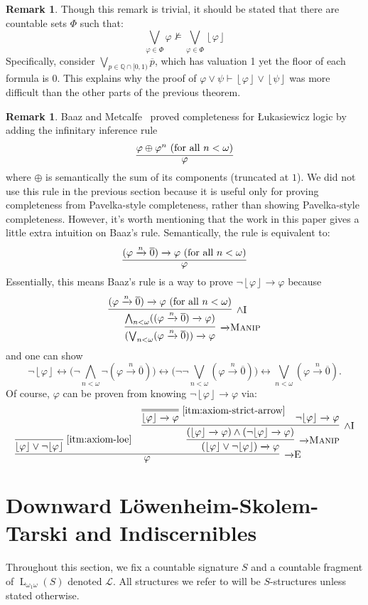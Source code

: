 \documentclass{amsart}
\theoremstyle{definition}
\newtheorem{remark}[theorem]{Remark}
\numberwithin{equation}{theorem}
\renewcommand{\phi}{\varphi}
\newcommand{\Q}{\mathbb{Q}}
\newcommand{\unwedge}{{\wedge}}
\newcommand{\proves}{\vdash}
\newcommand{\strict}[1]{{\left\lfloor#1\right\rfloor}}
\newcommand{\rat}[1]{{\overline{#1}}}
\newcommand{\narrow}[1]{\xrightarrow{#1}}
\renewcommand{\to}{\narrow{}}
\newcommand{\arr}{{\to}}
\newcommand{\intro}{\!\operatorname{I}}
\newcommand{\elim}{\!\operatorname{E}}
\newcommand{\aref}[1]{\!\text{\ref{itm:axiom-#1}}}
\newcommand{\pushdown}{\arr\text{\sc{Manip}}}
\newcommand{\baselang}{\operatorname{L}}
\newcommand{\lang}{\baselang_{\omega_1\omega}}
\newcommand{\frag}{\mathcal{L}}
\newcommand{\luk}{{\L}ukasiewicz}
\begin{document}
\begin{remark}
  Though this remark is trivial, it should be stated that there are countable sets $\Phi$ such that:
  \[
    \bigvee_{\phi\in\Phi}\phi\not\models\bigvee_{\phi\in\Phi}\strict\phi
  \]
  Specifically, consider $\bigvee_{p\in\Q\cap[0,1)}\rat p$, which has valuation 1 yet the floor of each formula is 0.
  This explains why the proof of $\phi\vee\psi\proves\strict\phi\vee\strict\psi$ was more difficult than the other parts of the previous theorem.
\end{remark}
\begin{remark}
  Baaz and Metcalfe~\cite{baaz2007lukasiewicz} proved completeness for {\luk} logic by adding the infinitary inference rule
  \[
    \infer{\phi}{\phi\oplus\phi^n\text{ (for all $n<\omega$)}}
  \]
  where $\oplus$ is semantically the sum of its components (truncated at $1$).
  We did not use this rule in the previous section because it is useful only for proving completeness from Pavelka-style completeness, rather than showing Pavelka-style completeness.
  However, it's worth mentioning that the work in this paper gives a little extra intuition on Baaz's rule.
  Semantically, the rule is equivalent to:
  \[
    \infer{\phi}{(\phi\narrow{n}\rat 0)\to\phi\text{ (for all $n<\omega$)}}
  \]
  Essentially, this means Baaz's rule is a way to prove $\neg\strict\phi\to\phi$ because
  \[
    \infer[\pushdown]{(\bigvee_{n<\omega}(\phi\narrow{n}\rat 0))\to\phi}{
      \infer[\unwedge\intro]{\bigwedge_{n<\omega}((\phi\narrow{n}\rat 0)\to\phi)}{
        (\phi\narrow{n}\rat 0)\to\phi\text{ (for all $n<\omega$)}
      }
    }
  \]
  and one can show
  \[
    \neg\strict\phi\leftrightarrow\Big(\neg\bigwedge_{n<\omega}\neg(\phi\narrow n\rat0)\Big)\leftrightarrow\Big(\neg\neg\bigvee_{n<\omega}(\phi\narrow n\rat 0)\Big)\leftrightarrow\bigvee_{n<\omega}(\phi\narrow n\rat 0).
  \]
  Of course, $\phi$ can be proven from knowing $\neg\strict\phi\to\phi$ via:
  \[
    \infer[\arr\elim]{\phi}{
      \infer[\aref{loe}]{\strict\phi\vee\neg\strict\phi}{} &
      \infer[\pushdown]{(\strict\phi\vee\neg\strict\phi)\to\phi}{
        \infer[\unwedge\intro]{(\strict\phi\to\phi)\wedge(\neg\strict\phi\to\phi)}{
          \infer=[\aref{strict-arrow}]{\strict\phi\to\phi}{} &
          \neg\strict\phi\to\phi
        }
      }
    }
  \]
\end{remark}


\section{Downward L\"owenheim-Skolem-Tarski and Indiscernibles}
Throughout this section, we fix a countable signature $S$ and a countable fragment of $\lang(S)$ denoted $\frag$.
All structures we refer to will be $S$-structures unless stated otherwise.
\end{document}
